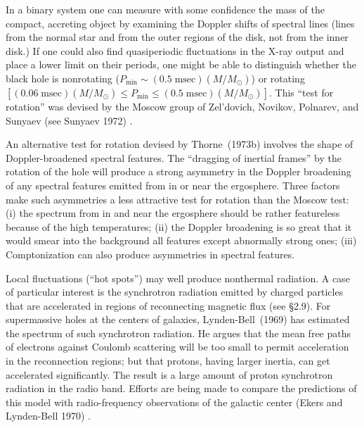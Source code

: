 In a binary system one can measure with some confidence the mass of the
compact, accreting object by examining the Doppler shifts of spectral lines
(lines from the normal star and from the outer regions of the disk, not from
the inner disk.) If one could also find quasiperiodic fluctuations in the X-ray
output and place a lower limit on their periods, one might be able to distinguish
whether the black hole is nonrotating ($P_{\min} \sim (0.5\;\text{msec})(M/M_\odot)$) or rotating
$[(0.06\;\text{msec})(M/M_\odot) \leq P_{\min} \leq (0.5\;\text{msec})(M/M_\odot)]$. This ``test for rotation'' was
devised by the Moscow group of Zel'dovich, Novikov, Polnarev, and Sunyaev
(see Sunyaev 1972) \cite{Sunyaev1972}.

An alternative test for rotation devised by Thorne~(1973b) \cite{Thorne1973b} involves the shape
of Doppler-broadened spectral features. The ``dragging of inertial frames'' by the
rotation of the hole will produce a strong asymmetry in the Doppler broadening
of any spectral features emitted from in or near the ergosphere. Three factors
make such asymmetries a less attractive test for rotation than the Moscow test:
(i) the spectrum from in and near the ergosphere should be rather featureless
because of the high temperatures; (ii) the Doppler broadening is so great that
it would smear into the background all features except abnormally strong ones;
(iii) Comptonization can also produce asymmetries in spectral features.

Local fluctuations (``hot spots'') may well produce nonthermal radiation. A
case of particular interest is the synchrotron radiation emitted by charged particles
that are accelerated in regions of reconnecting magnetic flux (see \S2.9). For
supermassive holes at the centers of galaxies, Lynden-Bell~(1969) \cite{LyndenBell1969} has estimated
the spectrum of such synchrotron radiation. He argues that the mean free paths
of electrons against Coulomb scattering will be too small to permit acceleration
in the reconnection regions; but that protons, having larger inertia, can get
accelerated significantly. The result is a large amount of proton synchrotron
radiation in the radio band. Efforts are being made to compare the predictions
of this model with radio-frequency observations of the galactic center (Ekers
and Lynden-Bell 1970) \cite{EkersLyndenBell1970}.


